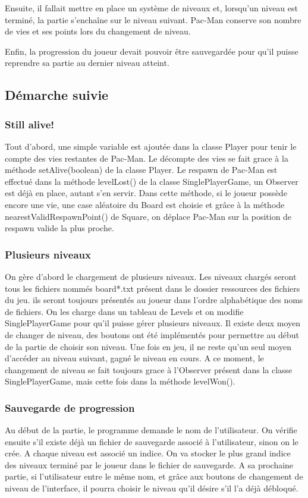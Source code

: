 \documentclass[a4paper,12pt]{report} %
\begin{document}
Ensuite, il fallait mettre en place un système de niveaux et, lorsqu'un
niveau est terminé, la partie s'enchaîne sur le niveau suivant. Pac-Man
conserve son nombre de vies et ses points lors du changement de niveau.

Enfin, la progression du joueur devait pouvoir être sauvegardée pour
qu'il puisse reprendre sa partie au dernier niveau atteint.

\subsection{Démarche suivie}
\subsubsection{Still alive!}
Tout d'abord, une simple variable est ajoutée dans la classe Player
pour tenir le compte des vies restantes de Pac-Man. Le décompte des
vies se fait grace à la méthode setAlive(boolean) de la classe Player.
Le respawn de Pac-Man est effectué dans la méthode levelLost() de
la classe SinglePlayerGame, un Observer est déjà en place, autant
s'en servir. Dans cette méthode, si le joueur possède encore une vie,
une case aléatoire du Board est choisie et grâce à la méthode nearestValidRespawnPoint()
de Square, on déplace Pac-Man sur la position de respawn valide la
plus proche.

\subsubsection{Plusieurs niveaux}
On gère d'abord le chargement de plusieurs niveaux. Les niveaux chargés
seront tous les fichiers nommés board{*}.txt présent dans le dossier
ressources des fichiers du jeu. ils seront toujours présentés au joueur
dans l'ordre alphabétique des noms de fichiers. On les charge dans
un tableau de Levels et on modifie SinglePlayerGame pour qu'il puisse
gérer plusieurs niveaux. Il existe deux moyen de changer de niveau,
des boutons ont été implémentés pour permettre au début de la partie
de choisir son niveau. Une fois en jeu, il ne reste qu'un seul moyen
d'accéder au niveau suivant, gagné le niveau en cours. A ce moment,
le changement de niveau se fait toujours grace à l'Observer présent
dans la classe SinglePlayerGame, mais cette fois dans la méthode levelWon().


\subsubsection{Sauvegarde de progression}
Au début de la partie, le programme demande le nom de l'utilisateur.
On vérifie ensuite s'il existe déjà un fichier de sauvegarde associé
à l'utilisateur, sinon on le crée. A chaque niveau est associé un
indice. On va stocker le plus grand indice des niveaux terminé par
le joueur dans le fichier de sauvegarde. A sa prochaine partie, si
l'utilisateur entre le même nom, et grâce aux boutons de changement
de niveau de l'interface, il pourra choisir le niveau qu'il désire
s'il l'a déjà débloqué.
\end{document}
